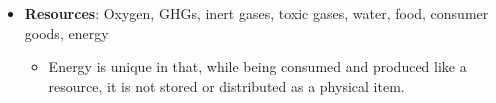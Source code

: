 \documentclass{article}
\begin{document}
\begin{itemize}
\begin{itemize}
\begin{itemize}
            \item Similar 1-6 scale
        \end{itemize}
        \item \textbf{Biomaterials}: Nutrients, pharmaceuticals, medical supplies, cell culture media, enzymes, engineered tissues, etc., but not
            directly industrial unless in a biotech context
        \begin{itemize}
            \item Similar 1-6 scale
        \end{itemize}
        \item \textbf{Nuclear materials}: Fissile materials for nuclear power
        \begin{itemize}
            \item Similar 1-6 scale
        \end{itemize}
    \end{itemize}
    \item \textbf{Resources}: Oxygen, GHGs, inert gases, toxic gases, water, food, consumer goods, energy
    \begin{itemize}
        \item Energy is unique in that, while being consumed and produced like a resource, it is not stored or distributed as a physical item.
    \end{itemize}
\end{itemize}
\end{document}
